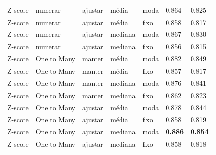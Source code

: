 \documentclass[11pt,a4paper]{article}
\begin{document}
\begin{table}[H]
\begin{tabular}{L{2.2cm}L{2cm}L{1.5cm}L{1.7cm}L{2cm}L{1.2cm}L{1.5cm}}
    Z-score & numerar & ajustar & média & moda & 0.864 & 0.825 \\
    Z-score & numerar & ajustar & média & fixo & 0.858 & 0.817 \\
    Z-score & numerar & ajustar & mediana & moda & 0.867 & 0.830 \\
    Z-score & numerar & ajustar & mediana & fixo & 0.856 & 0.815 \\
    Z-score & One to Many & manter & média & moda & 0.882 & 0.849 \\
    Z-score & One to Many & manter & média & fixo & 0.857 & 0.817 \\
    Z-score & One to Many & manter & mediana & moda & 0.876 & 0.841 \\
    Z-score & One to Many & manter & mediana & fixo & 0.862 & 0.823 \\
    Z-score & One to Many & ajustar & média & moda & 0.878 & 0.844 \\
    Z-score & One to Many & ajustar & média & fixo & 0.858 & 0.819 \\
    Z-score & One to Many & ajustar & mediana & moda & \textbf{0.886} & \textbf{0.854} \\
    Z-score & One to Many & ajustar & mediana & fixo & 0.858 & 0.818 \\
    \bottomrule
    \end{tabular}
\end{table}
\end{document}
